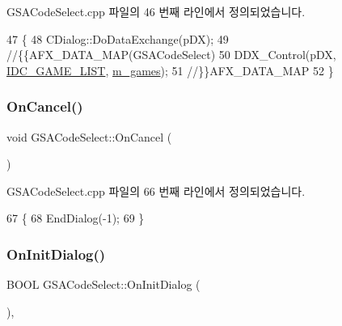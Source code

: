 G\+S\+A\+Code\+Select.\+cpp 파일의 46 번째 라인에서 정의되었습니다.


\begin{DoxyCode}
47 \{
48   CDialog::DoDataExchange(pDX);
49   \textcolor{comment}{//\{\{AFX\_DATA\_MAP(GSACodeSelect)}
50   DDX\_Control(pDX, \mbox{\hyperlink{resource_8h_a38ad587ec5c1e88dd287bf0d671291e0}{IDC\_GAME\_LIST}}, \mbox{\hyperlink{class_g_s_a_code_select_a732e7dca958e45d23a1d00234c23c838}{m\_games}});
51   \textcolor{comment}{//\}\}AFX\_DATA\_MAP}
52 \}
\end{DoxyCode}
\mbox{\label{class_g_s_a_code_select_ab959eeacc114c26cdb5933e4e501164b}} 
\subsubsection{\texorpdfstring{On\+Cancel()}{OnCancel()}}
{\footnotesize\ttfamily void G\+S\+A\+Code\+Select\+::\+On\+Cancel (\begin{DoxyParamCaption}{ }\end{DoxyParamCaption})\hspace{0.3cm}{\ttfamily [protected]}}



G\+S\+A\+Code\+Select.\+cpp 파일의 66 번째 라인에서 정의되었습니다.


\begin{DoxyCode}
67 \{
68   EndDialog(-1);
69 \}
\end{DoxyCode}
\mbox{\label{class_g_s_a_code_select_a8614bcbc03f8fc22303296416f66025f}} 
\subsubsection{\texorpdfstring{On\+Init\+Dialog()}{OnInitDialog()}}
{\footnotesize\ttfamily B\+O\+OL G\+S\+A\+Code\+Select\+::\+On\+Init\+Dialog (\begin{DoxyParamCaption}{ }\end{DoxyParamCaption})\hspace{0.3cm}{\ttfamily [protected]}, {\ttfamily [virtual]}}




